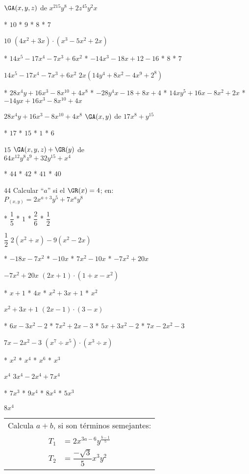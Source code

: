 $\GA(x,y,z)$ de $x^215y^8+2z^45y^2x$
\begin{enum}
	* $10$
	* $9$
	* $8$
	* $7$
\end{enum}
$10$
$\left(4x^2+3x\right)\cdot\left(x^3-5x^2+2x\right)$
\begin{enum}
	* $14x^5-17x^4-7x^3+6x^2$
	* $-14x^3-18x+12-16$
	* $8$
	* $7$
\end{enum}
$14x^5-17x^4-7x^3+6x^2$
$2x\left(14y^4+8x^2-4x^9+2^8\right)$
\begin{enum}
	* $28x^4y+16x^3-8x^{10}+4x^8$
	* $-28y^4x-18+8x+4$
	* $14xy^5+16x-8x^2+2x$
	* $-14yx+16x^3-8x^{10}+4x$
\end{enum}
$28x^4y+16x^3-8x^{10}+4x^8$
$\GA(x,y)$ de $17x^8+y^{15}$
\begin{enum}
	* $17$
	* $15$
	* $1$
	* $6$
\end{enum}
$15$
$\GA(x,y,z)+\GR(y)$ de \\
$64x^{12}y^8z^9+32y^{15}+x^4$
\begin{enum}
	* $44$
	* $42$
	* $41$
	* $40$
\end{enum}
$44$
Calcular ``$a$'' si el $\GR(x)=4$; en: \\
$P_{(x,y)}=2x^{a+3}y^5+7x^ay^8$
\begin{task}
	* $\dfrac{1}{5}$
	* $1$
	* $\dfrac{2}{6}$
	* $\dfrac{1}{2}$
\end{task}
$\dfrac{1}{2}$
$2\left(x^2+x\right)-9\left(x^2-2x\right)$
\begin{enum}
	* $-18x-7x^2$
	* $-10x$
	* $7x^2-10x$
	* $-7x^2+20x$
\end{enum}
$-7x^2+20x$
$(2x+1)\cdot\left(1+x-x^2\right)$
\begin{enum}
	* $x+1$
	* $4x$
	* $x^2+3x+1$
	* $x^2$
\end{enum}
$x^2+3x+1$
$(2x-1)\cdot(3-x)$
\begin{enum}
	* $6x-3x^2-2$
	* $7x^2+2x-3$
	* $5x+3x^2-2$
	* $7x-2x^2-3$
\end{enum}
$7x-2x^2-3$
$\left(x^7\div x^5\right)\cdot\left(x^3\div x\right)$
\begin{enum}
	* $x^2$
	* $x^4$
	* $x^6$
	* $x^3$
\end{enum}
$x^4$
$3x^4-2x^4+7x^4$
\begin{enum}
	* $7x^3$
	* $9x^4$
	* $8x^4$
	* $5x^3$
\end{enum}
$8x^4$
\begin{tabular}{c}
	Calcula $a+b$, si son t\'erminos semejantes: \\
	$\begin{aligned}
		T_1&=2x^{3a-6}y^{\frac{b-1}{5}} \\
		T_2&=\dfrac{-\sqrt{3}}{5}x^3y^2
	\end{aligned}$
\end{tabular}
